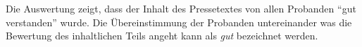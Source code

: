 Die Auswertung zeigt, dass der Inhalt des Pressetextes von allen Probanden
\enquote{gut verstanden} wurde. Die Übereinstimmung der Probanden
untereinander was die Bewertung des inhaltlichen Teils angeht kann als
\emph{gut} bezeichnet werden.








